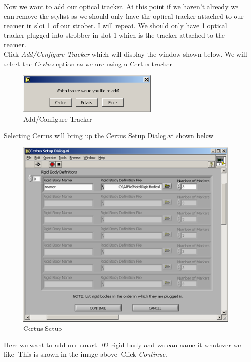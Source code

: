 \documentclass[pdftex,11pt,letterpaper]{article}
\begin{document}
Now we want to add our optical tracker. At this point if we haven’t already we can remove the stylist as we should only have the optical tracker attached to our reamer in slot 1 of our strober. I will repeat. We should only have 1 optical tracker plugged into strobber in slot 1 which is the tracker attached to the reamer. \\

Click \textit{Add/Configure Tracker} which will display the window shown below. We will select the \textit{Certus} option as we are using a Certus tracker

\begin{figure}[ht!]
\centering
\includegraphics[width=70mm]{./images/flock}
\caption{Add/Configure Tracker}
\end{figure}

Selecting Certus will bring up the Certus Setup Dialog.vi shown below

\begin{figure}[ht!]
\centering
\includegraphics[width=120mm]{./images/certus_setup}
\caption{Certus Setup}
\end{figure}

Here we want to add our smart\_02 rigid body and we can name it whatever we like. This is shown in the image above. Click \textit{Continue}. \\
\end{document}
